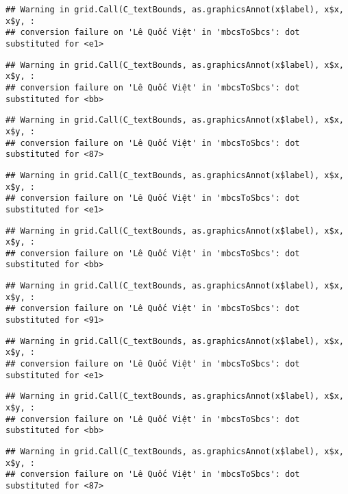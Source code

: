 \documentclass[
]{article}
\begin{document}
\begin{verbatim}
## Warning in grid.Call(C_textBounds, as.graphicsAnnot(x$label), x$x, x$y, :
## conversion failure on 'Lê Quốc Việt' in 'mbcsToSbcs': dot substituted for <e1>
\end{verbatim}

\begin{verbatim}
## Warning in grid.Call(C_textBounds, as.graphicsAnnot(x$label), x$x, x$y, :
## conversion failure on 'Lê Quốc Việt' in 'mbcsToSbcs': dot substituted for <bb>
\end{verbatim}

\begin{verbatim}
## Warning in grid.Call(C_textBounds, as.graphicsAnnot(x$label), x$x, x$y, :
## conversion failure on 'Lê Quốc Việt' in 'mbcsToSbcs': dot substituted for <87>
\end{verbatim}

\begin{verbatim}
## Warning in grid.Call(C_textBounds, as.graphicsAnnot(x$label), x$x, x$y, :
## conversion failure on 'Lê Quốc Việt' in 'mbcsToSbcs': dot substituted for <e1>
\end{verbatim}

\begin{verbatim}
## Warning in grid.Call(C_textBounds, as.graphicsAnnot(x$label), x$x, x$y, :
## conversion failure on 'Lê Quốc Việt' in 'mbcsToSbcs': dot substituted for <bb>
\end{verbatim}

\begin{verbatim}
## Warning in grid.Call(C_textBounds, as.graphicsAnnot(x$label), x$x, x$y, :
## conversion failure on 'Lê Quốc Việt' in 'mbcsToSbcs': dot substituted for <91>
\end{verbatim}

\begin{verbatim}
## Warning in grid.Call(C_textBounds, as.graphicsAnnot(x$label), x$x, x$y, :
## conversion failure on 'Lê Quốc Việt' in 'mbcsToSbcs': dot substituted for <e1>
\end{verbatim}

\begin{verbatim}
## Warning in grid.Call(C_textBounds, as.graphicsAnnot(x$label), x$x, x$y, :
## conversion failure on 'Lê Quốc Việt' in 'mbcsToSbcs': dot substituted for <bb>
\end{verbatim}

\begin{verbatim}
## Warning in grid.Call(C_textBounds, as.graphicsAnnot(x$label), x$x, x$y, :
## conversion failure on 'Lê Quốc Việt' in 'mbcsToSbcs': dot substituted for <87>
\end{verbatim}
\end{document}
